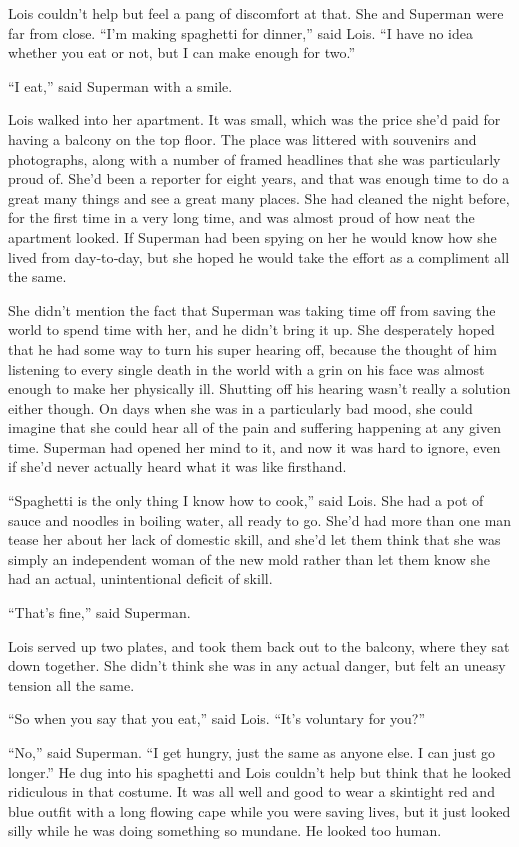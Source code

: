 \documentclass[ebook,12pt]{memoir}
\begin{document}
Lois couldn't help but feel a pang of discomfort at that. She and
Superman were far from close. ``I'm making spaghetti for dinner,'' said
Lois. ``I have no idea whether you eat or not, but I can make enough for
two.''

``I eat,'' said Superman with a smile.

Lois walked into her apartment. It was small, which was the price she'd
paid for having a balcony on the top floor. The place was littered with
souvenirs and photographs, along with a number of framed headlines that
she was particularly proud of. She'd been a reporter for eight years,
and that was enough time to do a great many things and see a great many
places. She had cleaned the night before, for the first time in a very
long time, and was almost proud of how neat the apartment looked. If
Superman had been spying on her he would know how she lived from
day‐to‐day, but she hoped he would take the effort as a compliment all
the same.

She didn't mention the fact that Superman was taking time off from
saving the world to spend time with her, and he didn't bring it up. She
desperately hoped that he had some way to turn his super hearing off,
because the thought of him listening to every single death in the world
with a grin on his face was almost enough to make her physically ill.
Shutting off his hearing wasn't really a solution either though. On days
when she was in a particularly bad mood, she could imagine that she
could hear all of the pain and suffering happening at any given time.
Superman had opened her mind to it, and now it was hard to ignore, even
if she'd never actually heard what it was like firsthand.

``Spaghetti is the only thing I know how to cook,'' said Lois. She had a
pot of sauce and noodles in boiling water, all ready to go. She'd had
more than one man tease her about her lack of domestic skill, and she'd
let them think that she was simply an independent woman of the new mold
rather than let them know she had an actual, unintentional deficit of
skill.

``That's fine,'' said Superman.

Lois served up two plates, and took them back out to the balcony, where
they sat down together. She didn't think she was in any actual danger,
but felt an uneasy tension all the same.

``So when you say that you eat,'' said Lois. ``It's voluntary for you?''

``No,'' said Superman. ``I get hungry, just the same as anyone else. I
can just go longer.'' He dug into his spaghetti and Lois couldn't help
but think that he looked ridiculous in that costume. It was all well and
good to wear a skintight red and blue outfit with a long flowing cape
while you were saving lives, but it just looked silly while he was doing
something so mundane. He looked too human.
\end{document}
